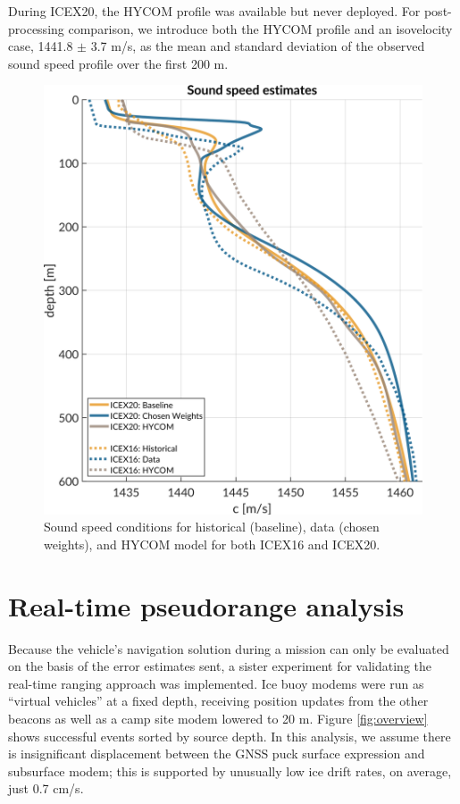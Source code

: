 During ICEX20, the HYCOM profile was available but never deployed. 
For post-processing comparison, we introduce both the HYCOM profile and an isovelocity case, 1441.8 $\pm$ 3.7 m/s, as the mean and standard deviation of the observed sound speed profile over the first 200 m.

\begin{figure}[h!]
	\centering
	\includegraphics[width=\reprintcolumnwidth]{figs/ssp-gvel-icex20-icex16.pdf}
	\caption{Sound speed conditions for historical (baseline), data (chosen weights), and HYCOM model for both ICEX16 and ICEX20.}
	\label{fig:sspExpectation}
\end{figure}

\clearpage
\section{\label{sec:realtime} Real-time pseudorange analysis}

Because the vehicle's navigation solution during a mission can only be evaluated on the basis of the error estimates sent, a sister experiment for validating the real-time ranging approach was implemented.
Ice buoy modems were run as ``virtual vehicles'' at a fixed depth, receiving position updates from the other beacons as well as a camp site modem lowered to 20 m. 
Figure \ref{fig:overview} shows successful events sorted by source depth.
In this analysis, we assume there is insignificant displacement between the GNSS puck surface expression and subsurface modem; this is supported by unusually low ice drift rates, on average, just 0.7 cm/s.

